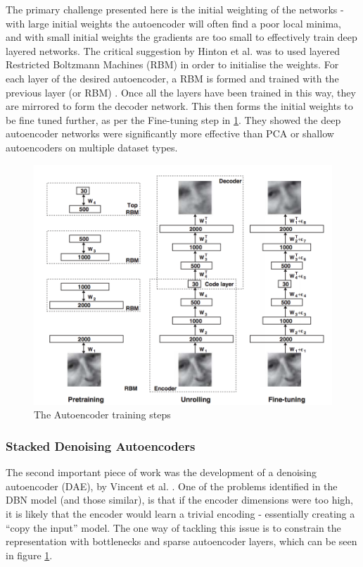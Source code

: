 \documentclass[a4paper,latin]{paper}
\begin{document}
The primary challenge presented here is the initial weighting of the networks - with large initial weights the 
autoencoder will often find a poor local minima, and with small initial weights the gradients are too small to 
effectively train deep layered networks. The critical suggestion by Hinton et al. was to used layered Restricted 
Boltzmann Machines (RBM) in order to initialise the weights. For each layer of the desired autoencoder, a RBM is 
formed and trained with the previous layer (or RBM) \cite{Hinton3}. Once all the layers have been 
trained in this way, they are mirrored to form the decoder network. This then forms the initial weights to be fine 
tuned further, as per the Fine-tuning step in \ref{figure-DBN-RBM}. They showed the deep autoencoder networks were significantly more 
effective than PCA or shallow autoencoders on multiple dataset types. 
 \hfill \break 
 
\begin{figure}
\centering \includegraphics[scale=0.5]{images/DBN-RBM-process.png}
 \caption{The Autoencoder training steps \cite{Hinton2}}
 \label{figure-DBN-RBM}
 \end{figure}
 
\subsubsection {Stacked Denoising Autoencoders}\label{SDAE}

 The second important piece of work was the development of a denoising autoencoder (DAE), by Vincent  et al. \cite{Vincent}. 
 One of the problems identified in the DBN model (and those similar), is that if the encoder dimensions were too high, 
 it is likely that the encoder would learn a trivial encoding - essentially creating a “copy the input” model. The one way
  of tackling this issue is to constrain the representation with bottlenecks and sparse autoencoder layers, which can be seen in figure  \ref{figure-DBN-RBM}.
  \hfill \break 
\end{document}
